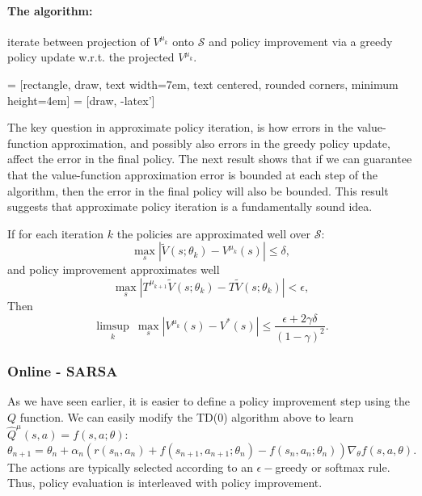 \paragraph{The algorithm:} iterate between projection of $V^{\mu_k}$ onto $\mathcal{S}$ and policy improvement via a greedy policy update w.r.t. the projected $V^{\mu_k}$.

\vspace{20pt}
 = [rectangle, draw,
    text width=7em, text centered, rounded corners, minimum height=4em]
 = [draw, -latex']
\vspace{20pt}

The key question in approximate policy iteration, is how errors in the value-function approximation, and possibly also errors in the greedy policy update, affect the error in the final policy. The next result shows that if we can guarantee that the value-function approximation error is bounded at each step of the algorithm, then the error in the final policy will also be bounded. This result suggests that approximate policy iteration is a fundamentally sound idea.

\begin{theorem}\label{thm:API}
If for each iteration $k$ the policies are approximated well over $\mathcal{S}$:
$$\max_s |\tilde{V}(s;\theta_k)-V^{\mu_k}(s)| \le \delta,$$
and policy improvement approximates well
$$ \max_s |T^{\mu_{k+1}}\tilde{V}(s;\theta_k) - T\tilde{V}(s;\theta_k)| < \epsilon,$$
Then
$$ \limsup_k \ \max_s | V^{\mu_k}(s)-V^*(s)| \le \frac{\epsilon+2\gamma\delta}{(1-\gamma)^2}.$$
\end{theorem}

\subsubsection{Online - SARSA}
As we have seen earlier, it is easier to define a policy improvement step using the $Q$ function. We can easily modify the TD(0) algorithm above to learn $\hat{Q}^\mu(s,a) = f(s,a;\theta)$:
\begin{equation*}
    \theta_{n+1} = \theta_n + \alpha_n \left( r(s_n,a_n) + f(s_{n+1},a_{n+1};\theta_n) - f(s_{n},a_{n}; \theta_n) \right) \nabla_{\theta} f(s,a,\theta).
\end{equation*}
The actions are typically selected according to an $\epsilon-$greedy or softmax rule. Thus, policy evaluation is interleaved with policy improvement.

